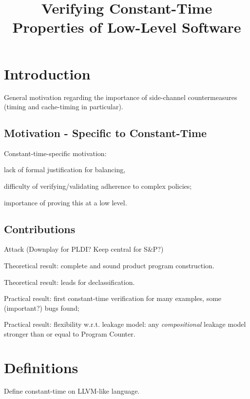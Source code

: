 \documentclass[letterpaper,10pt]{IEEEtran} %
\title{Verifying Constant-Time Properties of Low-Level Software}
\begin{document}
\maketitle

\section{Introduction}

General motivation regarding the importance of side-channel
countermeasures (timing and cache-timing in particular).

\subsection{Motivation - Specific to Constant-Time}
Constant-time-specific motivation:
\begin{compactitem}
\item lack of formal justification for balancing,
\item difficulty of verifying/validating adherence to complex
  policies;
\item importance of proving this at a low level.
\end{compactitem}

\subsection{Contributions}
\begin{compactitem}
\item Attack (Downplay for PLDI? Keep central for S\&P?)
\item Theoretical result: complete and sound product program
  construction.
\item Theoretical result: leads for declassification.
\item Practical result: first constant-time verification for many
  examples, some (important?) bugs found;
\item Practical result: flexibility w.r.t. leakage model: any
  \emph{compositional} leakage model stronger than or equal to Program
  Counter.
\end{compactitem}

\section{Definitions}

\begin{compactitem}
\item Define constant-time on LLVM-like language.
\end{compactitem}
\end{document}
